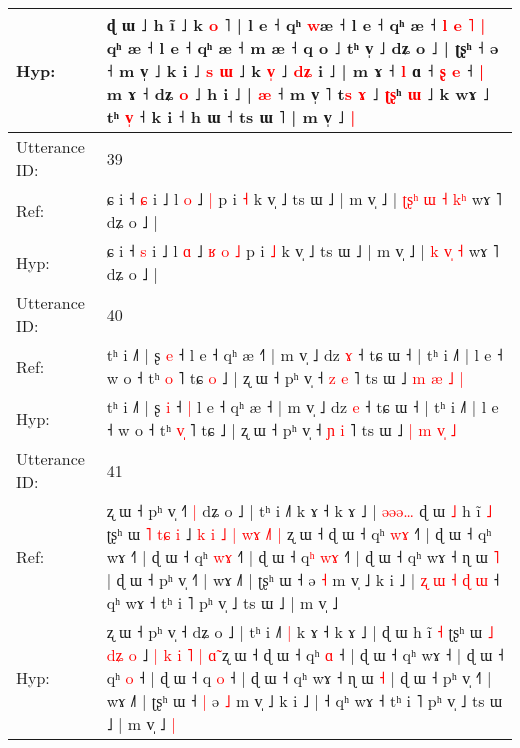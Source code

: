 \documentclass[10pt]{article}
\DeclareRobustCommand{\hl}[1]{{\textcolor{red}{#1}}}
\begin{document}
\begin{longtable}{ll}
 \\
Hyp: & ɖ ɯ ˩ h ĩ ˩ k \hl{o} ˥ | l e ˧ qʰ \hl{w}æ ˧\hl{}\hl{}\hl{} l e ˧ qʰ æ ˧\hl{} \hl{l} \hl{e} \hl{˥} \hl{|} qʰ æ ˧\hl{}\hl{}\hl{} l e ˧ qʰ æ ˧\hl{}\hl{}\hl{} m æ ˧ q o ˩ tʰ v̩ ˩ dʑ o ˩ | ʈʂʰ\hl{}\hl{} ˧ ə ˧ m v̩ ˩ k i ˩ \hl{}\hl{s} \hl{}\hl{ɯ} ˩ k \hl{v}\hl{̩} ˩\hl{}\hl{} \hl{d}\hl{ʑ} i ˩\hl{} | m ɤ ˧ \hl{l} ɑ ˧ \hl{ʂ} \hl{}\hl{e} ˧\hl{}\hl{}\hl{}\hl{} \hl{|} m ɤ ˧ dʑ \hl{o} ˩ h i\hl{} ˩ | \hl{æ} ˧ m v̩ ˥ t\hl{s} \hl{ɤ} ˩\hl{}\hl{}\hl{}\hl{}\hl{} \hl{}\hl{ʈ}\hl{ʂ}ʰ \hl{}\hl{ɯ} ˩ k\hl{} wɤ\hl{}\hl{}\hl{}\hl{}\hl{}\hl{} ˩\hl{}\hl{} tʰ \hl{v}\hl{̩} ˧ k i ˧ h ɯ ˧ ts ɯ \hl{}˥ | m v̩ ˩\hl{ }\hl{|}
 \\
\midrule
Utterance ID: & 39 \\
Ref: & ɕ i ˧ \hl{ɕ} i ˩ l \hl{o} ˩\hl{}\hl{}\hl{}\hl{} \hl{|} p i \hl{˧} k v̩ ˩ ts ɯ ˩ | m v̩ ˩ | \hl{ʈ}\hl{ʂ}\hl{ʰ} \hl{ɯ}\hl{ }\hl{˧} \hl{k}\hl{ʰ} wɤ ˥ dʑ o ˩ |
 \\
Hyp: & ɕ i ˧ \hl{s} i ˩ l \hl{ɑ} ˩\hl{ }\hl{ʁ}\hl{ }\hl{o} \hl{˩} p i \hl{˩} k v̩ ˩ ts ɯ ˩ | m v̩ ˩ | \hl{}\hl{}\hl{k} \hl{}\hl{v}\hl{̩} \hl{}\hl{˧} wɤ ˥ dʑ o ˩ |
 \\
\midrule
Utterance ID: & 40 \\
Ref: & tʰ i ˩˥ | ʂ \hl{e} ˧\hl{}\hl{} l e ˧ qʰ æ ˧\hl{˥} | m v̩ ˩ dz \hl{ɤ} ˧ tɕ ɯ ˧ | tʰ i ˩˥ | l e ˧ w o ˧ tʰ \hl{}\hl{o} ˥ tɕ\hl{ }\hl{o} ˩ | ʐ ɯ ˧ pʰ v̩ ˧ \hl{z} \hl{e} ˥ ts ɯ ˩ \hl{m} \hl{æ} \hl{}\hl{˩} \hl{|}
 \\
Hyp: & tʰ i ˩˥ | ʂ \hl{i} ˧\hl{ }\hl{|} l e ˧ qʰ æ ˧\hl{} | m v̩ ˩ dz \hl{e} ˧ tɕ ɯ ˧ | tʰ i ˩˥ | l e ˧ w o ˧ tʰ \hl{v}\hl{̩} ˥ tɕ\hl{}\hl{} ˩ | ʐ ɯ ˧ pʰ v̩ ˧ \hl{ɲ} \hl{i} ˥ ts ɯ ˩ \hl{|} \hl{m} \hl{v}\hl{̩} \hl{˩}
 \\
\midrule
Utterance ID: & 41 \\
Ref: & ʐ ɯ ˧ pʰ v̩ ˧\hl{˥}\hl{ }\hl{|} dʑ o ˩ | tʰ i ˩˥\hl{}\hl{} k ɤ ˧ k ɤ ˩ |\hl{ }\hl{ə}\hl{ə}\hl{ə}\hl{…} ɖ ɯ\hl{ }\hl{˩} h ĩ \hl{˩} ʈʂʰ ɯ \hl{˥} \hl{t}\hl{ɕ} \hl{i} ˩ \hl{k} \hl{i} \hl{˩} \hl{|} \hl{w}\hl{ɤ} \hl{˩}\hl{˥}\hl{ }\hl{|} ʐ ɯ ˧ ɖ ɯ ˧ qʰ \hl{w}\hl{ɤ} ˧\hl{˥} | ɖ ɯ ˧ qʰ wɤ ˧\hl{˥} | ɖ ɯ ˧ qʰ \hl{w}\hl{ɤ} ˧\hl{˥} | ɖ ɯ ˧ q\hl{ʰ} \hl{w}\hl{ɤ} ˧\hl{˥} | ɖ ɯ ˧ qʰ wɤ ˧ ɳ ɯ \hl{˥} | ɖ ɯ ˧ pʰ v̩ ˧˥ | wɤ ˩˥ | ʈʂʰ ɯ ˧\hl{}\hl{} ə \hl{˧} m v̩ ˩ k i ˩ |\hl{ }\hl{ʐ}\hl{ }\hl{ɯ}\hl{ }\hl{˧}\hl{ }\hl{ɖ}\hl{ }\hl{ɯ} ˧ qʰ wɤ ˧ tʰ i ˥ pʰ v̩ ˩ ts ɯ ˩ | m v̩ ˩\hl{}\hl{}
 \\
Hyp: & ʐ ɯ ˧ pʰ v̩ ˧\hl{}\hl{}\hl{} dʑ o ˩ | tʰ i ˩˥\hl{ }\hl{|} k ɤ ˧ k ɤ ˩ |\hl{}\hl{}\hl{}\hl{}\hl{} ɖ ɯ\hl{}\hl{} h ĩ \hl{˧} ʈʂʰ ɯ \hl{˩} \hl{d}\hl{ʑ} \hl{o} ˩ \hl{|} \hl{k} \hl{i} \hl{˥} \hl{}\hl{|} \hl{}\hl{}\hl{ɑ}\hl{̃} ʐ ɯ ˧ ɖ ɯ ˧ qʰ \hl{}\hl{ɑ} ˧\hl{} | ɖ ɯ ˧ qʰ wɤ ˧\hl{} | ɖ ɯ ˧ qʰ \hl{}\hl{o} ˧\hl{} | ɖ ɯ ˧ q\hl{} \hl{}\hl{o} ˧\hl{} | ɖ ɯ ˧ qʰ wɤ ˧ ɳ ɯ \hl{˧} | ɖ ɯ ˧ pʰ v̩ ˧˥ | wɤ ˩˥ | ʈʂʰ ɯ ˧\hl{ }\hl{|} ə \hl{˩} m v̩ ˩ k i ˩ |\hl{}\hl{}\hl{}\hl{}\hl{}\hl{}\hl{}\hl{}\hl{}\hl{} ˧ qʰ wɤ ˧ tʰ i ˥ pʰ v̩ ˩ ts ɯ ˩ | m v̩ ˩\hl{ }\hl{|}

\end{longtable}
\end{document}
